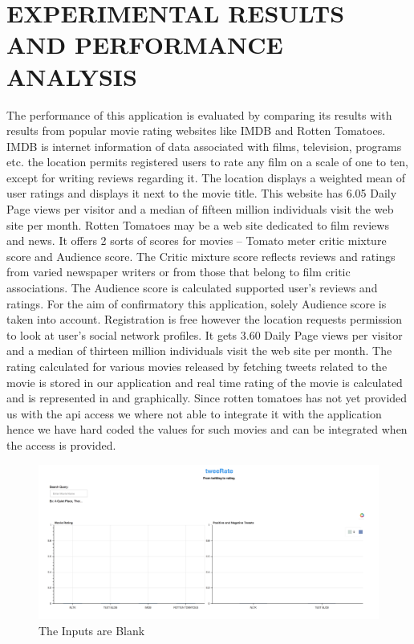 \documentclass[a4paper]{article}
\begin{document}
\section{EXPERIMENTAL RESULTS AND
PERFORMANCE ANALYSIS}
The performance of this application is evaluated by comparing its results with results from popular movie rating websites like IMDB and Rotten Tomatoes. IMDB is internet information of data associated with films, television, programs etc. the location permits registered users to rate any film on a scale of one to ten, except for writing reviews regarding it. The location displays a weighted mean of user ratings and displays it next to the movie title. 
This website has 6.05 Daily Page views per visitor and a median of fifteen million individuals visit the web site per month. Rotten Tomatoes may be a web site dedicated to film reviews and news. It offers 2 sorts of scores for movies – Tomato meter critic mixture score and Audience score. The Critic mixture score reflects reviews and ratings from varied newspaper writers or from those that belong to film critic associations. The Audience score is calculated supported user’s reviews and ratings. For the aim of confirmatory this application, solely Audience score is taken into account. Registration is free however the location requests permission to look at user’s social network profiles. It gets 3.60 Daily Page views per visitor and a median of thirteen million individuals visit the web site per month. The rating calculated for various movies released by fetching tweets related to the movie is stored in our application and real time rating of the movie is calculated and is represented in and graphically. Since rotten tomatoes has not yet provided us with the api access we where not able to integrate it with the application hence we have hard coded the values for such movies and can be integrated when the access is provided. 
\begin{figure}[h!]
\centering
\includegraphics[width=1.0\textwidth]{Screen_Shot_2018-05-01_at_20_24_37.png}
\caption{\label{fig:blank}The Inputs are Blank}
\end{figure}\\ \\ \\
\end{document}
